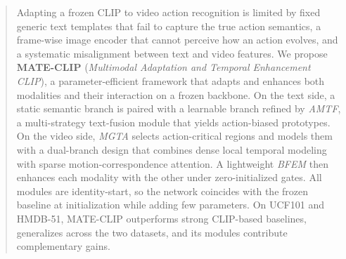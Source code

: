 \begin{abstract}
Adapting a frozen CLIP to video action recognition is limited by fixed generic text templates that fail to capture the true action semantics, a frame-wise image encoder that cannot perceive how an action evolves, and a systematic misalignment between text and video features.
We propose \textbf{MATE-CLIP} (\emph{Multimodal Adaptation and Temporal Enhancement CLIP}), a parameter-efficient framework that adapts and enhances both modalities and their interaction on a frozen backbone.
On the text side, a static semantic branch is paired with a learnable branch refined by \emph{AMTF}, a multi-strategy text-fusion module that yields action-biased prototypes.
On the video side, \emph{MGTA} selects action-critical regions and models them with a dual-branch design that combines dense local temporal modeling with sparse motion-correspondence attention.
A lightweight \emph{BFEM} then enhances each modality with the other under zero-initialized gates.
All modules are identity-start, so the network coincides with the frozen baseline at initialization while adding few parameters.
On UCF101 and HMDB-51, MATE-CLIP outperforms strong CLIP-based baselines, generalizes across the two datasets, and its modules contribute complementary gains.
\end{abstract}
